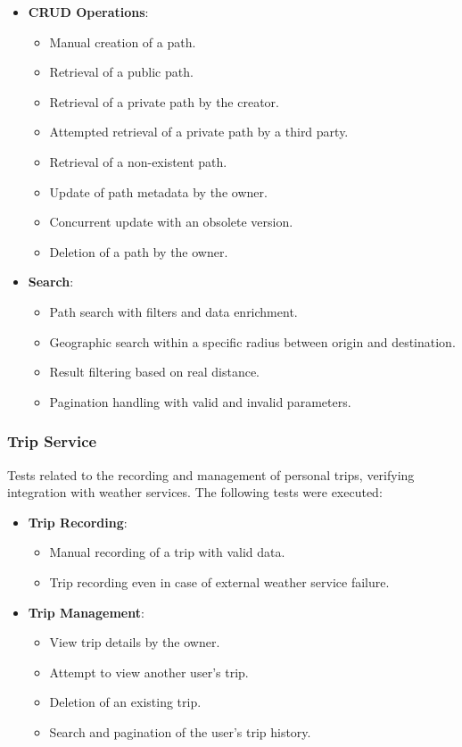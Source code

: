 \begin{itemize}
    \item \textbf{CRUD Operations}:
    \begin{itemize}
        \item Manual creation of a path.
        \item Retrieval of a public path.
        \item Retrieval of a private path by the creator.
        \item Attempted retrieval of a private path by a third party.
        \item Retrieval of a non-existent path.
        \item Update of path metadata by the owner.
        \item Concurrent update with an obsolete version.
        \item Deletion of a path by the owner.
    \end{itemize}
    
    \item \textbf{Search}:
    \begin{itemize}
        \item Path search with filters and data enrichment.
        \item Geographic search within a specific radius between origin and destination.
        \item Result filtering based on real distance.
        \item Pagination handling with valid and invalid parameters.
    \end{itemize}
\end{itemize}

\subsubsection{Trip Service}
Tests related to the recording and management of personal trips, verifying integration with weather services. The following tests were executed:

\begin{itemize}
    \item \textbf{Trip Recording}:
    \begin{itemize}
        \item Manual recording of a trip with valid data.
        \item Trip recording even in case of external weather service failure.
    \end{itemize}
    
    \item \textbf{Trip Management}:
    \begin{itemize}
        \item View trip details by the owner.
        \item Attempt to view another user's trip.
        \item Deletion of an existing trip.
        \item Search and pagination of the user's trip history.
    \end{itemize}
\end{itemize}

